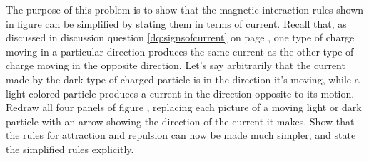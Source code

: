 The purpose of this problem is to show that the magnetic interaction rules shown in figure
 can be simplified by stating them in terms of current. 
Recall that, as discussed in discussion question \ref{dq:signsofcurrent} on page
\pageref{dq:signsofcurrent}, one type of charge moving in a particular direction produces
the same current as the other type of charge moving in the opposite direction. 
Let's say arbitrarily that the current made by the dark type of charged particle is
in the direction it's moving, while a light-colored particle produces a current in the
direction opposite to its motion. Redraw all four panels of figure ,
replacing each picture of a moving light or dark particle with an
arrow showing the direction of the current it makes. Show that the rules for attraction and
repulsion can now be made much simpler, and state the simplified rules explicitly.
